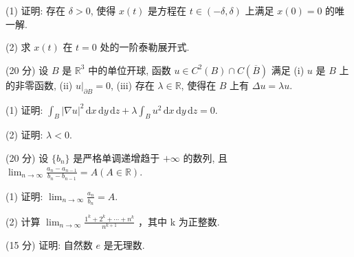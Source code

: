 (1) 证明: 存在 $\delta > 0$, 使得 $x(t)$ 是方程在 $t \in (-\delta, \delta)$ 上满足 $x(0) = 0$ 的唯一解.\par
(2) 求 $x(t)$ 在 $t = 0$ 处的一阶泰勒展开式.\par
(20 分) 设 $B$ 是 $\mathbb{R}^3$ 中的单位开球, 函数 $u \in C^2(B) \cap C(\overline{B})$ 满足 (i) $u$ 是 $B$ 上的非零函数, (ii) $u|_{\partial B} = 0$, (iii) 存在 $\lambda \in \mathbb{R}$, 使得在 $B$ 上有 $\Delta u = \lambda u$.\par
(1) 证明: $\int_{B} |\nabla u|^{2} \, \mathrm{d}x \, \mathrm{d}y \, \mathrm{d}z + \lambda \int_{B} u^{2} \, \mathrm{d}x \, \mathrm{d}y \, \mathrm{d}z = 0$.\par
(2) 证明: $\lambda < 0$.\par
(20 分) 设 $\{b_n\}$ 是严格单调递增趋于 $+\infty$ 的数列, 且 $\lim_{n \to \infty} \frac{a_n - a_{n-1}}{b_n - b_{n-1}} = A (A \in \mathbb{R})$.\par
(1) 证明: $\lim_{n\to \infty}\frac{a_n}{b_n} = A.$\par
(2) 计算  $\lim_{n\to\infty}\frac{1^{k}+2^{k}+\cdots+n^{k}}{n^{k+1}}$ ，其中 k 为正整数.\par
(15 分) 证明: 自然数 $e$ 是无理数.\par
